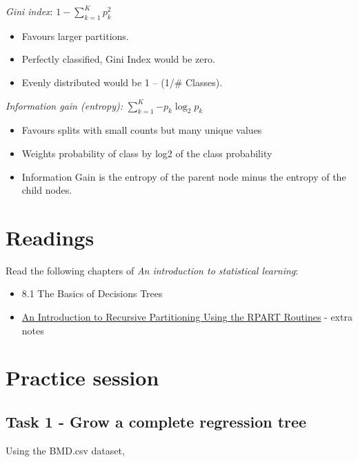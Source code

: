 \documentclass[
]{book}
\providecommand{\tightlist}{%
  \setlength{\itemsep}{0pt}\setlength{\parskip}{0pt}}
\begin{document}
\emph{Gini index}: \(1-\sum_{k=1}^K{p_k^2}\)

\begin{itemize}
\tightlist
\item
  Favours larger partitions.
\item
  Perfectly classified, Gini Index would be zero.
\item
  Evenly distributed would be 1 -- (1/\# Classes).
\end{itemize}

\emph{Information gain (entropy):} \(\sum_{k=1}^K{-p_k\log_2 p_k}\)

\begin{itemize}
\tightlist
\item
  Favours splits with small counts but many unique values
\item
  Weights probability of class by log2 of the class probability
\item
  Information Gain is the entropy of the parent node minus the entropy of the child nodes.
\end{itemize}

\section{Readings}\label{CART2}

Read the following chapters of \emph{An introduction to statistical learning}:

\begin{itemize}
\tightlist
\item
  8.1 The Basics of Decisions Trees
\item
  \href{https://cran.r-project.org/web/packages/rpart/vignettes/longintro.pdf}{An Introduction to Recursive Partitioning Using the RPART Routines} - extra
  notes
\end{itemize}

\section{Practice session}\label{CART3}

\subsection*{Task 1 - Grow a complete regression tree}\label{task-1---grow-a-complete-regression-tree}

Using the BMD.csv dataset,
\end{document}
